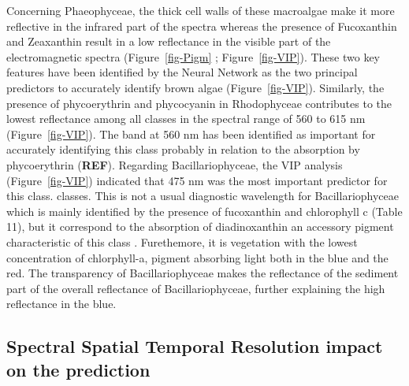 \documentclass[
  number]{elsarticle}
\begin{document}
Concerning Phaeophyceae, the thick cell walls of these macroalgae
\citep{charrier2021growth} make it more reflective in the infrared part
of the spectra \citep{Slaton2001} whereas the presence of Fucoxanthin
and Zeaxanthin result in a low reflectance in the visible part of the
electromagnetic spectra (Figure~\ref{fig-Pigm} ; Figure~\ref{fig-VIP}).
These two key features have been identified by the Neural Network as the
two principal predictors to accurately identify brown algae
(Figure~\ref{fig-VIP}). Similarly, the presence of phycoerythrin and
phycocyanin in Rhodophyceae contributes to the lowest reflectance among
all classes in the spectral range of 560 to 615 nm
(Figure~\ref{fig-VIP}). The band at 560 nm has been identified as
important for accurately identifying this class probably in relation to
the absorption by phycoerythrin (\textbf{REF}). Regarding
Bacillariophyceae, the VIP analysis (Figure~\ref{fig-VIP}) indicated
that 475 nm was the most important predictor for this class. classes.
This is not a usual diagnostic wavelength for Bacillariophyceae which is
mainly identified by the presence of fucoxanthin and chlorophyll c
(Table 11), but it correspond to the absorption of diadinoxanthin an
accessory pigment characteristic of this class
\citep{meleder2003spectrometric}. Furethemore, it is vegetation with the
lowest concentration of chlorphyll-a, pigment absorbing light both in
the blue and the red. The transparency of Bacillariophyceae makes the
reflectance of the sediment part of the overall reflectance of
Bacillariophyceae, further explaining the high reflectance in the blue.

\subsection{Spectral Spatial Temporal Resolution impact on the
prediction}\label{spectral-spatial-temporal-resolution-impact-on-the-prediction}
\end{document}
